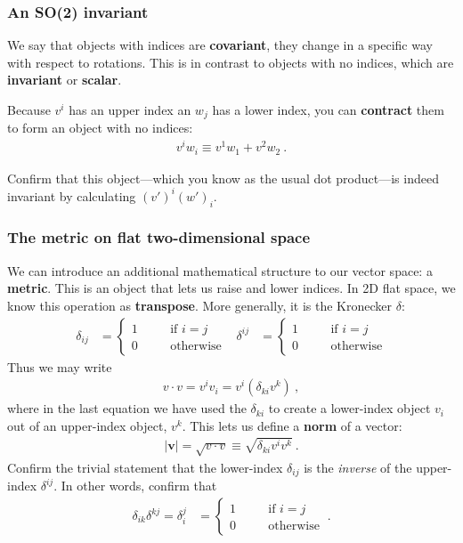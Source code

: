 \documentclass[12pt]{article}
\renewcommand{\vec}[1]{\mathbf{#1}} %
\begin{document}
\subsubsection{An SO(2) invariant} 

We say that objects with indices are \textbf{covariant}, they change in a specific way with respect to rotations. This is in contrast to objects with no indices, which are \textbf{invariant} or \textbf{scalar}. 

Because $v^i$ has an upper index an $w_j$ has a lower index, you can \textbf{contract} them to form an object with no indices:
\begin{align}
	v^i w_i \equiv v^1 w_1 + v^2 w_2  \ .
\end{align}

Confirm that this object---which you know as the usual dot product---is indeed invariant by calculating $(v')^i(w')_i$. 

\subsubsection{The metric on flat two-dimensional space} 

We can introduce an additional mathematical structure to our vector space: a \textbf{metric}. This is an object that lets us raise and lower indices. In 2D flat space, we know this operation as \textbf{transpose}. More generally, it is the Kronecker $\delta$:
\begin{align}
	\delta_{ij} &=
	\left\{
	\begin{array}{lcl}
		1 & \quad & \text{if $i = j$}\\
		0 & \quad & \text{otherwise}
	\end{array}
	\right.
	&
	\delta^{ij} &=
	\left\{
	\begin{array}{lcl}
		1 & \quad & \text{if $i = j$}\\
		0 & \quad & \text{otherwise}
	\end{array}
	\right.
\end{align}
Thus we may write
\begin{align}
	v\cdot v = v^i v_i = v^i (\delta_{k i} v^k) \ ,
\end{align}
where in the last equation we have used the $\delta_{ki}$ to create a lower-index object $v_i$ out of an upper-index object, $v^k$. This lets us define a \textbf{norm} of a vector:
\begin{align}
	|\vec v| = \sqrt{v\cdot v} \equiv \sqrt{ \delta_{k i} v^iv^k} \ .
\end{align}
Confirm the trivial statement that the lower-index $\delta_{ij}$ is the \emph{inverse} of the upper-index $\delta^{ij}$. In other words, confirm that
\begin{align}
	\delta_{ik}\delta^{kj} = \delta_i^j &=
	\left\{
	\begin{array}{lcl}
		1 & \quad & \text{if $i = j$}\\
		0 & \quad & \text{otherwise}
	\end{array}
	\right. \ .
\end{align}
\end{document}
